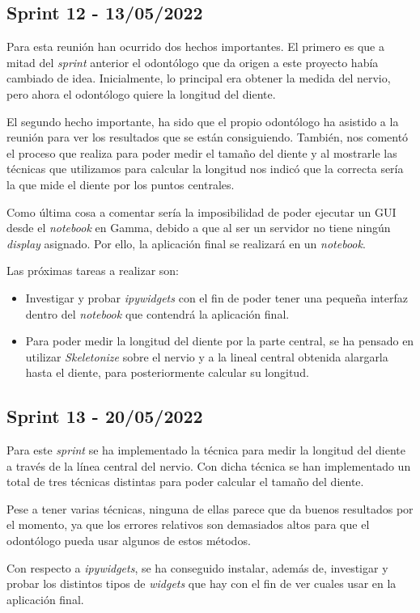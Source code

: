 \subsection{Sprint 12 - 13/05/2022}
Para esta reunión han ocurrido dos hechos importantes. El primero es que a mitad del \emph{sprint} anterior el odontólogo que da origen a este proyecto había cambiado de idea. Inicialmente, lo principal era obtener la medida del nervio, pero ahora el odontólogo quiere la longitud del diente.

El segundo hecho importante, ha sido que el propio odontólogo ha asistido a la reunión para ver los resultados que se están consiguiendo. También, nos comentó el proceso que realiza para poder medir el tamaño del diente y al mostrarle las técnicas que utilizamos para calcular la longitud nos indicó que la correcta sería la que mide el diente por los puntos centrales.

Como última cosa a comentar sería la imposibilidad de poder ejecutar un GUI desde el \emph{notebook} en Gamma, debido a que al ser un servidor no tiene ningún \emph{display}
asignado. Por ello, la aplicación final se realizará en un \emph{notebook}.

Las próximas tareas a realizar son:
\begin{itemize}
    \item Investigar y probar \emph{ipywidgets} con el fin de poder tener una pequeña interfaz dentro del \emph{notebook} que contendrá la aplicación final.
    \item Para poder medir la longitud del diente por la parte central, se ha pensado en utilizar \emph{Skeletonize} sobre el nervio y a la lineal central obtenida alargarla hasta el diente, para posteriormente calcular su longitud.
\end{itemize}
\subsection{Sprint 13 - 20/05/2022}
Para este \emph{sprint} se ha implementado la técnica para medir la longitud del diente a través de la línea central del nervio. Con dicha técnica se han implementado un total de tres técnicas distintas para poder calcular el tamaño del diente.

Pese a tener varias técnicas, ninguna de ellas parece que da buenos resultados por el momento, ya que los errores relativos son demasiados altos para que el odontólogo pueda usar algunos de estos métodos.

Con respecto a \emph{ipywidgets}, se ha conseguido instalar, además de, investigar y probar los distintos tipos de \emph{widgets} que hay con el fin de ver cuales usar en la aplicación final.

